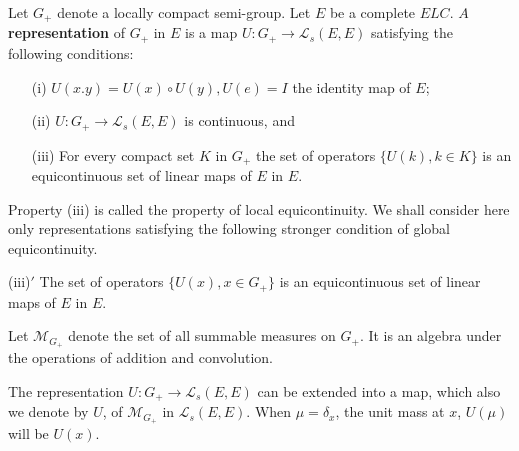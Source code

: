 
\setcounter{definition}{5}
\begin{definition}\label{chap17:def17.6a}
Let $G_+$ denote a locally compact semi-group. Let $E$ be a complete
$E L C$. $A$ {\bf representation} of $G_+$ in $E$ is a map $U : G_+
\to \mathscr{L}_s(E, E)$ satisfying the following conditions:
\begin{itemize}
\item [(i)] $U(x.y)=U(x) \circ U(y), U(e)=I$ the identity map of $E$;
\item [(ii)] $U : G_+ \to \mathscr{L}_s(E, E)$ is continuous, and
\item [(iii)] For every compact set $K$ in $G_+$ the set of operators
  $\{U(k), k \in K\}$ is an equicontinuous set of linear maps of $E$
  in $E$. 
\end{itemize}

Property (iii) is called the property of local equicontinuity. We
shall consider here only representations satisfying the following
stronger condition of global equicontinuity. 

\noindent (iii)$'$ The set of operators $\{U(x), x \in G_+\}$ is an
equicontinuous set of linear maps of $E$ in $E$. 

Let $\mathscr{M}_{G_+}$ denote the set of all summable measures on
$G_+$. It is an algebra under the operations of addition and
convolution. 
\end{definition}
 \begin{lemma}\label{chap17:lem17.3}
The representation $U : G_+ \to \mathscr{L}_s(E, E)$ can be extended
into a map, which also we denote by $U$, of $\mathscr{M}_{G_+}$ in
$\mathscr{L}_s(E, E)$. When $\mu = \delta_x$, the unit mass at $x$,
$U(\mu)$ will be $U(x)$. 
 \end{lemma}

